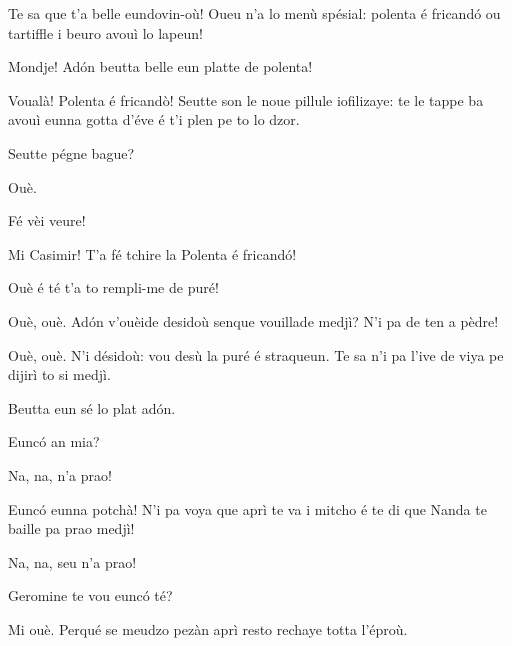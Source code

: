 \begin{drama}
\Fernandaspeaks Te sa que t’a belle eundovin-où! Oueu n'a lo menù spésial: polenta é fricand\'o ou tartiffle i beuro avouì lo lapeun!

\Casimirspeaks Mondje! Ad\'on beutta belle eun platte de polenta!


\Fernandaspeaks Voualà! Polenta é fricandò! Seutte son le noue pillule iofilizaye: te le tappe ba avouì eunna gotta d'éve é t'i plen pe to lo dzor.

\Casimirspeaks Seutte pégne bague?

\Fernandaspeaks  Ouè.

\Gerominespeaks{} Fé vèi veure!


\Fernandaspeaks Mi Casimir! T’a fé tchire la Polenta é fricand\'o! 

\Casimirspeaks Ouè é té t'a to rempli-me de puré!

\Fernandaspeaks {} Ouè, ouè. Ad\'on v'ouèide desidoù senque vouillade medjì? N'i pa de ten a pèdre!

\Casimirspeaks Ouè, ouè. N'i désidoù: vou desù la puré é straqueun. Te sa n’i pa l’ive de viya pe dijirì to si medjì.

\Fernandaspeaks Beutta eun sé lo plat ad\'on.


\Fernandaspeaks  Eunc\'o an mia?

\Casimirspeaks  Na, na, n'a prao!


\Fernandaspeaks Eunc\'o eunna potchà! N'i pa voya que aprì te va i mi\-tcho é te di que Nanda te baille pa prao medjì!

\Casimirspeaks Na, na, seu n'a prao!

\Fernandaspeaks{} Geromine te vou eunc\'o té?

\Gerominespeaks Mi ouè. Perqué se meudzo pezàn aprì resto rechaye totta l'éproù.



\end{drama}
